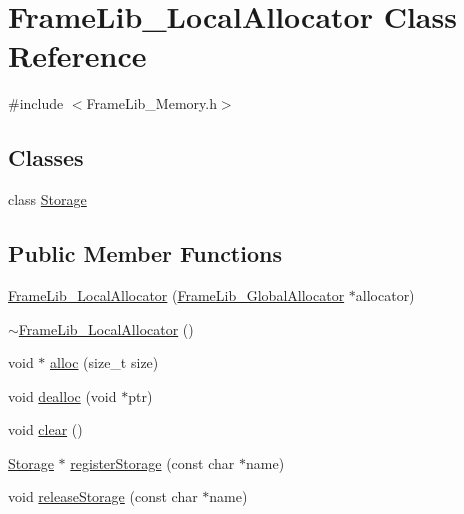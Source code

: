 \hypertarget{class_frame_lib___local_allocator}{}\section{Frame\+Lib\+\_\+\+Local\+Allocator Class Reference}
\label{class_frame_lib___local_allocator}


{\ttfamily \#include $<$Frame\+Lib\+\_\+\+Memory.\+h$>$}

\subsection*{Classes}
\begin{DoxyCompactItemize}
\item 
class \hyperlink{class_frame_lib___local_allocator_1_1_storage}{Storage}
\end{DoxyCompactItemize}
\subsection*{Public Member Functions}
\begin{DoxyCompactItemize}
\item 
\hyperlink{class_frame_lib___local_allocator_a218131bb74240289b83dc7cd0e0ad6a7}{Frame\+Lib\+\_\+\+Local\+Allocator} (\hyperlink{class_frame_lib___global_allocator}{Frame\+Lib\+\_\+\+Global\+Allocator} $\ast$allocator)
\item 
\hyperlink{class_frame_lib___local_allocator_a7c7bc361ea0fc016fdc7da6282c963d4}{$\sim$\+Frame\+Lib\+\_\+\+Local\+Allocator} ()
\item 
void $\ast$ \hyperlink{class_frame_lib___local_allocator_a47d3c43f0a7d094b7d237850523828df}{alloc} (size\+\_\+t size)
\item 
void \hyperlink{class_frame_lib___local_allocator_ab0e907ad680da0a20143c1fe251d0ec8}{dealloc} (void $\ast$ptr)
\item 
void \hyperlink{class_frame_lib___local_allocator_a5d4eef90190d3699cb2026da02749dd5}{clear} ()
\item 
\hyperlink{class_frame_lib___local_allocator_1_1_storage}{Storage} $\ast$ \hyperlink{class_frame_lib___local_allocator_a9659c558d40a3c5b41c1d09f293c39bf}{register\+Storage} (const char $\ast$name)
\item 
void \hyperlink{class_frame_lib___local_allocator_a5bbca2317e172ec8afa22be33a70d748}{release\+Storage} (const char $\ast$name)
\end{DoxyCompactItemize}
